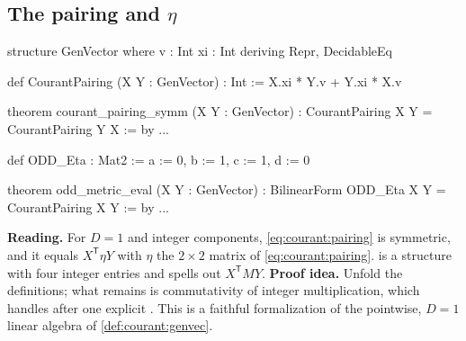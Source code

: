\subsection{The pairing and \texorpdfstring{$\eta$}{eta}}

\begin{leanbox}
\begin{leancode}
structure GenVector where
  v : Int
  xi : Int
deriving Repr, DecidableEq

def CourantPairing (X Y : GenVector) : Int :=
  X.xi * Y.v + Y.xi * X.v

theorem courant_pairing_symm (X Y : GenVector) :
    CourantPairing X Y = CourantPairing Y X := by ...

def ODD_Eta : Mat2 := { a := 0, b := 1, c := 1, d := 0 }

theorem odd_metric_eval (X Y : GenVector) :
    BilinearForm ODD_Eta X Y = CourantPairing X Y := by ...
\end{leancode}
\textbf{Reading.} For $D=1$ and integer components, \eqref{eq:courant:pairing} is symmetric, and it
equals $X^{\mathsf T}\eta Y$ with $\eta$ the $2\times2$ matrix of \eqref{eq:courant:pairing}.
 is a structure with four integer entries and  spells out
$X^{\mathsf T}MY$. \textbf{Proof idea.} Unfold the definitions; what remains is commutativity of
integer multiplication, which  handles after one explicit . This is
a faithful formalization of the pointwise, $D=1$ linear algebra of
\cref{def:courant:genvec}. \TA
\end{leanbox}

